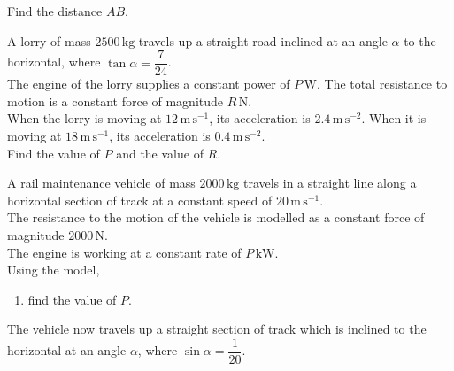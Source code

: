 \documentclass[leqno]{article}
\begin{document}
\begin{enumerate}[
  label=\textbf{\arabic*.},
  leftmargin=*,
  topsep=0pt,
  partopsep=0pt,
  parsep=0pt
]
\begin{enumerate}[label=\textbf{(\alph*)}]
  Find the distance $AB$.  \\
\end{enumerate}

\newpage

\questionitem

A lorry of mass $2500\,\mathrm{kg}$ travels up a straight road inclined at an angle $\alpha$ to the horizontal, where $\tan\alpha=\dfrac{7}{24}$. \\

The engine of the lorry supplies a constant power of $P\,\mathrm{W}$. The total resistance to motion is a constant force of magnitude $R\,\mathrm{N}$. \\

When the lorry is moving at $12\,\mathrm{m\,s^{-1}}$, its acceleration is $2.4\,\mathrm{m\,s^{-2}}$. When it is moving at $18\,\mathrm{m\,s^{-1}}$, its acceleration is $0.4\,\mathrm{m\,s^{-2}}$. \\

Find the value of $P$ and the value of $R$.  \\

\newpage

\questionitem

A rail maintenance vehicle of mass $2000\,\mathrm{kg}$ travels in a straight line along a horizontal section of track at a constant speed of $20\,\mathrm{m\,s^{-1}}$. \\

The resistance to the motion of the vehicle is modelled as a constant force of magnitude $2000\,\mathrm{N}$. \\

The engine is working at a constant rate of $P\,\mathrm{kW}$. \\

Using the model, \\

\begin{enumerate}[label=\textbf{(\alph*)}]
  \item find the value of $P$.  \\
\end{enumerate}

The vehicle now travels up a straight section of track which is inclined to the horizontal at an angle $\alpha$, where $\sin \alpha = \dfrac{1}{20}$. \\


\end{enumerate}
\end{document}
